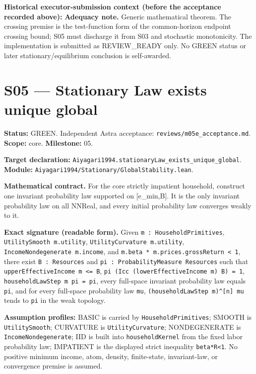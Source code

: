 \documentclass[
  11pt,
]{article}
\let\LedgerOriginalTexttt\texttt
\renewcommand{\texttt}[1]{{\small\LedgerOriginalTexttt{#1}}}
\begin{document}
\textbf{Historical executor-submission context (before the acceptance
recorded above):} \textbf{Adequacy note.} Generic mathematical theorem.
The crossing premise is the test-function form of the common-horizon
endpoint crossing bound; S05 must discharge it from S03 and stochastic
monotonicity. The implementation is submitted as REVIEW\_READY only. No
GREEN status or later stationary/equilibrium conclusion is self-awarded.

\section{S05 --- Stationary Law exists unique
global}\label{s05-stationary-law-exists-unique-global}

\textbf{Status:} GREEN. Independent Astra acceptance:
\texttt{reviews/m05e\_acceptance.md}. \textbf{Scope:} core.
\textbf{Milestone:} 05.

\textbf{Target declaration:}
\texttt{Aiyagari1994.stationaryLaw\_exists\_unique\_global}.\\
\textbf{Module:} \texttt{Aiyagari1994/Stationary/GlobalStability.lean}.

\textbf{Mathematical contract.} For the core strictly impatient
household, construct one invariant probability law supported on
{[}e\_min,B{]}. It is the only invariant probability law on all NNReal,
and every initial probability law converges weakly to it.

\textbf{Exact signature (readable form).} Given
\texttt{m\ :\ HouseholdPrimitives}, \texttt{UtilitySmooth\ m.utility},
\texttt{UtilityCurvature\ m.utility},
\texttt{IncomeNondegenerate\ m.income}, and
\texttt{m.beta\ *\ m.prices.grossReturn\ \textless{}\ 1}, there exist
\texttt{B\ :\ Resources} and
\texttt{pi\ :\ ProbabilityMeasure\ Resources} such that
\texttt{upperEffectiveIncome\ m\ \textless{}=\ B},
\texttt{pi\ (Icc\ (lowerEffectiveIncome\ m)\ B)\ =\ 1},
\texttt{householdLawStep\ m\ pi\ =\ pi}, every full-space invariant
probability law equals \texttt{pi}, and for every full-space probability
law \texttt{mu}, \texttt{(householdLawStep\ m)\^{}{[}n{]}\ mu} tends to
\texttt{pi} in the weak topology.

\textbf{Assumption profiles:} BASIC is carried by
\texttt{HouseholdPrimitives}; SMOOTH is \texttt{UtilitySmooth};
CURVATURE is \texttt{UtilityCurvature}; NONDEGENERATE is
\texttt{IncomeNondegenerate}; IID is built into \texttt{householdKernel}
from the fixed labor probability law; IMPATIENT is the displayed strict
inequality \texttt{beta*R\textless{}1}. No positive minimum income,
atom, density, finite-state, invariant-law, or convergence premise is
assumed.
\end{document}
